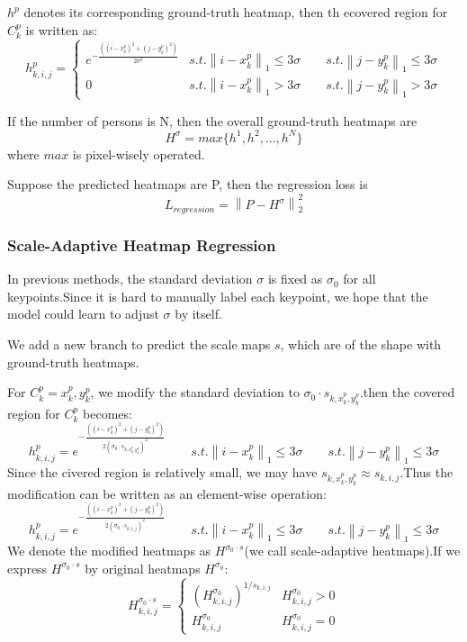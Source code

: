 \documentclass[11pt]{article}
\begin{document}
$h^p$ denotes its corresponding ground-truth heatmap, then th ecovered region for $C_k^p$ is written as:
$$h^p_{k,i,j}=\left\{\begin{matrix}
	e^{-\frac{((i-x_k^p)^2+(j-y_k^p)^2)}{2\sigma^2}} &s.t. \left \| i-x^p_k\right \|_1\leq 3\sigma \qquad s.t. \left \| j-y^p_k\right \|_1\leq 3\sigma \\ 
	0 &s.t. \left \| i-x^p_k\right \|_1>3\sigma \qquad s.t. \left \| j-y^p_k\right \|_1>3\sigma 
\end{matrix}\right.$$

If the number of persons is N, then the overall ground-truth heatmaps are $$H^{\sigma}=max \{h^1,h^2,...,h^N\}$$
where $max$ is pixel-wisely operated.

Suppose the predicted heatmaps are P, then the regression loss is 
$$L_{regression}=\left \|P-H^{\sigma} \right \|^2_2$$

\subsubsection{Scale-Adaptive Heatmap Regression}
In previous methods, the standard deviation $\sigma$ is fixed as $\sigma_0$ for all keypoints.Since it is hard to manually label each keypoint, we hope that the model could learn to adjust $\sigma$ by itself.

We add a new branch to predict the scale maps $s$, which are of the shape with ground-truth heatmaps.

For $C^p_k={x^p_k,y^p_k}$, we modify the standard deviation to $\sigma_0\cdot s_{k,x^p_k,y^p_k}$.then the covered region for $C^p_k$ becomes:
$$h^p_{k,i,j}=
	e^{-\frac{((i-x_k^p)^2+(j-y_k^p)^2)}{2(\sigma_0\cdot s_{k,x^p_k,y^p_k})^2}} \qquad s.t. \left \| i-x^p_k\right \|_1\leq 3\sigma \qquad s.t. \left \| j-y^p_k\right \|_1\leq 3\sigma 
$$
Since the civered region is relatively small, we may have $s_{k,x^p_k,y^p_k}\approx s_{k,i,j}$.Thus the modification can be written as an element-wise operation:
$$h^p_{k,i,j}=
e^{-\frac{((i-x_k^p)^2+(j-y_k^p)^2)}{2(\sigma_0\cdot s_{k,i,j})^2}} \qquad s.t. \left \| i-x^p_k\right \|_1\leq 3\sigma \qquad s.t. \left \| j-y^p_k\right \|_1\leq 3\sigma 
$$
We denote the modified heatmaps as $H^{\sigma_0\cdot s}$(we call scale-adaptive heatmaps).If we express $H^{\sigma_0\cdot s}$ by original heatmaps $H^{\sigma_0}$:
$$H^{\sigma_0\cdot s}_{k,i,j}=\left\{\begin{matrix}
(H^{\sigma_0}_{k,i,j})^{1/s_{k,i,j}} &H^{\sigma_0}_{k,i,j}>0\\ 
	H^{\sigma_0}_{k,i,j}&H^{\sigma_0}_{k,i,j}=0 
\end{matrix}\right.$$
\end{document}
